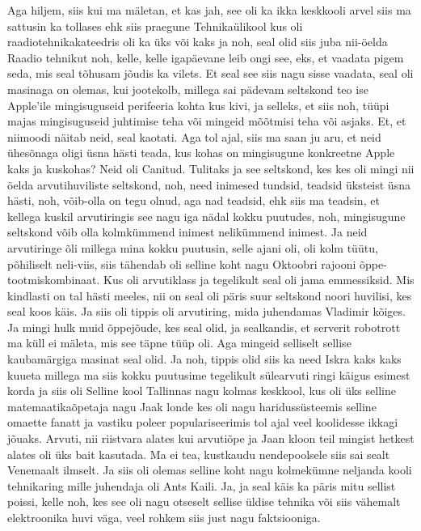 Aga hiljem, siis kui ma mäletan, et kas jah, see oli ka ikka keskkooli arvel siis ma sattusin ka tollases ehk siis praegune Tehnikaülikool kus oli raadiotehnikakateedris oli ka üks või kaks ja noh, seal olid siis juba nii-öelda Raadio tehnikut noh, kelle, kelle igapäevane leib ongi see, eks, et vaadata pigem seda, mis seal tõhusam jõudis ka vilets. Et seal see siis nagu sisse vaadata, seal oli masinaga on olemas, kui jootekolb, millega sai pädevam seltskond teo ise Apple'ile mingisuguseid perifeeria kohta kus kivi, ja selleks, et siis noh, tüüpi majas mingisuguseid juhtimise teha või mingeid mõõtmisi teha või asjaks. Et, et niimoodi näitab neid, seal kaotati.
Aga tol ajal, siis ma saan ju aru, et neid ühesõnaga oligi üsna hästi teada, kus kohas on mingisugune konkreetne Apple kaks ja kuskohas? Neid oli Canitud.
Tulitaks ja see seltskond, kes kes oli mingi nii öelda arvutihuviliste seltskond, noh, need inimesed tundsid, teadsid üksteist üsna hästi, noh, võib-olla on tegu olnud, aga nad teadsid, ehk siis ma teadsin, et kellega kuskil arvutiringis see nagu iga nädal kokku puutudes, noh, mingisugune seltskond võib olla kolmkümmend inimest nelikümmend inimest. Ja neid arvutiringe õli millega mina kokku puutusin, selle ajani oli, oli kolm tüütu, põhiliselt neli-viis, siis tähendab oli selline koht nagu Oktoobri rajooni õppe-tootmiskombinaat.
Kus oli arvutiklass ja tegelikult seal oli jama emmessiksid.
Mis kindlasti on tal hästi meeles, nii on seal oli päris suur seltskond noori huvilisi, kes seal koos käis. Ja siis oli tippis oli arvutiring, mida juhendamas Vladimir kõiges. Ja mingi hulk muid õppejõude, kes seal olid, ja sealkandis, et serverit robotrott ma küll ei mäleta, mis see täpne tüüp oli. Aga mingeid selliselt sellise kaubamärgiga masinat seal olid. Ja noh, tippis olid siis ka need Iskra kaks kaks kuueta millega ma siis kokku puutusime tegelikult sülearvuti ringi käigus esimest korda ja siis oli
Selline kool Tallinnas nagu kolmas keskkool, kus oli üks selline matemaatikaõpetaja nagu Jaak londe kes oli nagu haridussüsteemis selline omaette fanatt ja vastiku poleer populariseerimis tol ajal veel koolidesse ikkagi jõuaks. Arvuti, nii riistvara alates kui arvutiõpe ja Jaan kloon teil mingist hetkest alates oli üks bait kasutada. Ma ei tea, kustkaudu nendepoolsele siis sai sealt Venemaalt ilmselt. Ja siis oli olemas selline koht nagu kolmekümne neljanda kooli tehnikaring mille juhendaja oli Ants Kaili. Ja, ja seal käis ka päris mitu sellist poissi, kelle noh, kes see oli nagu otseselt sellise üldise tehnika või siis vähemalt elektroonika huvi väga, veel rohkem siis just nagu faktsiooniga.
